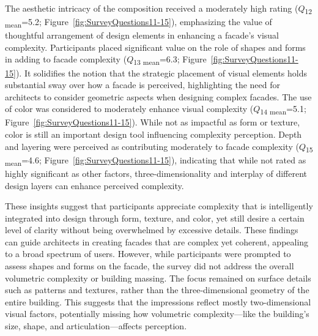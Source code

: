 The aesthetic intricacy of the composition received a moderately high rating (\(Q\)\textsubscript{\small{12 mean}}=5.2; Figure~\ref{fig:SurveyQuestions11-15}), emphasizing the value of thoughtful arrangement of design elements in enhancing a facade's visual complexity.
Participants placed significant value on the role of shapes and forms in adding to facade complexity (\(Q\)\textsubscript{\small{13 mean}}=6.3; Figure~\ref{fig:SurveyQuestions11-15}).
It solidifies the notion that the strategic placement of visual elements holds substantial sway over how a facade is perceived, highlighting the need for architects to consider geometric aspects when designing complex facades.
The use of color was considered to moderately enhance visual complexity (\(Q\)\textsubscript{\small{14 mean}}=5.1; Figure~\ref{fig:SurveyQuestions11-15}). While not as impactful as form or texture, color is still an important design tool influencing complexity perception.
Depth and layering were perceived as contributing moderately to facade complexity (\(Q\)\textsubscript{\small{15 mean}}=4.6; Figure~\ref{fig:SurveyQuestions11-15}), indicating that while not rated as highly significant as other factors, three-dimensionality and interplay of different design layers can enhance perceived complexity.

These insights suggest that participants appreciate complexity that is intelligently integrated into design through form, texture, and color, yet still desire a certain level of clarity without being overwhelmed by excessive details.
These findings can guide architects in creating facades that are complex yet coherent, appealing to a broad spectrum of users.
However, while participants were prompted to assess shapes and forms on the facade, the survey did not address the overall volumetric complexity or building massing.
The focus remained on surface details such as patterns and textures, rather than the three-dimensional geometry of the entire building.
This suggests that the impressions reflect mostly two-dimensional visual factors, potentially missing how volumetric complexity—like the building's size, shape, and articulation—affects perception.

